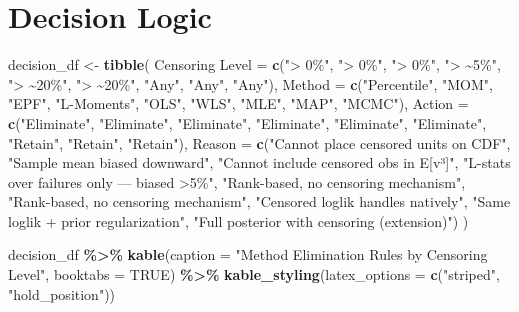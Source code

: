 \documentclass[
]{article}
\newenvironment{Shaded}{\begin{snugshade}}{\end{snugshade}}
\newcommand{\AttributeTok}[1]{\textcolor[rgb]{0.13,0.29,0.53}{#1}}
\newcommand{\ConstantTok}[1]{\textcolor[rgb]{0.56,0.35,0.01}{#1}}
\newcommand{\FunctionTok}[1]{\textcolor[rgb]{0.13,0.29,0.53}{\textbf{#1}}}
\newcommand{\NormalTok}[1]{#1}
\newcommand{\OtherTok}[1]{\textcolor[rgb]{0.56,0.35,0.01}{#1}}
\newcommand{\SpecialCharTok}[1]{\textcolor[rgb]{0.81,0.36,0.00}{\textbf{#1}}}
\newcommand{\StringTok}[1]{\textcolor[rgb]{0.31,0.60,0.02}{#1}}
\begin{document}
\section{Decision Logic}\label{decision-logic}

\begin{Shaded}
\begin{Highlighting}[]
\NormalTok{decision\_df }\OtherTok{\textless{}{-}} \FunctionTok{tibble}\NormalTok{(}
  \StringTok{\textasciigrave{}}\AttributeTok{Censoring Level}\StringTok{\textasciigrave{}} \OtherTok{=} \FunctionTok{c}\NormalTok{(}\StringTok{"\textgreater{} 0\%"}\NormalTok{, }\StringTok{"\textgreater{} 0\%"}\NormalTok{, }\StringTok{"\textgreater{} 0\%"}\NormalTok{, }\StringTok{"\textgreater{} \textasciitilde{}5\%"}\NormalTok{, }\StringTok{"\textgreater{} \textasciitilde{}20\%"}\NormalTok{, }\StringTok{"\textgreater{} \textasciitilde{}20\%"}\NormalTok{,}
                        \StringTok{"Any"}\NormalTok{, }\StringTok{"Any"}\NormalTok{, }\StringTok{"Any"}\NormalTok{),}
  \AttributeTok{Method =} \FunctionTok{c}\NormalTok{(}\StringTok{"Percentile"}\NormalTok{, }\StringTok{"MOM"}\NormalTok{, }\StringTok{"EPF"}\NormalTok{, }\StringTok{"L{-}Moments"}\NormalTok{, }\StringTok{"OLS"}\NormalTok{, }\StringTok{"WLS"}\NormalTok{,}
             \StringTok{"MLE"}\NormalTok{, }\StringTok{"MAP"}\NormalTok{, }\StringTok{"MCMC"}\NormalTok{),}
  \AttributeTok{Action =} \FunctionTok{c}\NormalTok{(}\StringTok{"Eliminate"}\NormalTok{, }\StringTok{"Eliminate"}\NormalTok{, }\StringTok{"Eliminate"}\NormalTok{, }\StringTok{"Eliminate"}\NormalTok{,}
             \StringTok{"Eliminate"}\NormalTok{, }\StringTok{"Eliminate"}\NormalTok{, }\StringTok{"Retain"}\NormalTok{, }\StringTok{"Retain"}\NormalTok{, }\StringTok{"Retain"}\NormalTok{),}
  \AttributeTok{Reason =} \FunctionTok{c}\NormalTok{(}\StringTok{"Cannot place censored units on CDF"}\NormalTok{,}
             \StringTok{"Sample mean biased downward"}\NormalTok{,}
             \StringTok{"Cannot include censored obs in E[v³]"}\NormalTok{,}
             \StringTok{"L{-}stats over failures only — biased \textgreater{}5\%"}\NormalTok{,}
             \StringTok{"Rank{-}based, no censoring mechanism"}\NormalTok{,}
             \StringTok{"Rank{-}based, no censoring mechanism"}\NormalTok{,}
             \StringTok{"Censored loglik handles natively"}\NormalTok{,}
             \StringTok{"Same loglik + prior regularization"}\NormalTok{,}
             \StringTok{"Full posterior with censoring (extension)"}\NormalTok{)}
\NormalTok{)}

\NormalTok{decision\_df }\SpecialCharTok{\%\textgreater{}\%}
  \FunctionTok{kable}\NormalTok{(}\AttributeTok{caption =} \StringTok{"Method Elimination Rules by Censoring Level"}\NormalTok{,}
        \AttributeTok{booktabs =} \ConstantTok{TRUE}\NormalTok{) }\SpecialCharTok{\%\textgreater{}\%}
  \FunctionTok{kable\_styling}\NormalTok{(}\AttributeTok{latex\_options =} \FunctionTok{c}\NormalTok{(}\StringTok{"striped"}\NormalTok{, }\StringTok{"hold\_position"}\NormalTok{))}
\end{Highlighting}
\end{Shaded}
\end{document}
